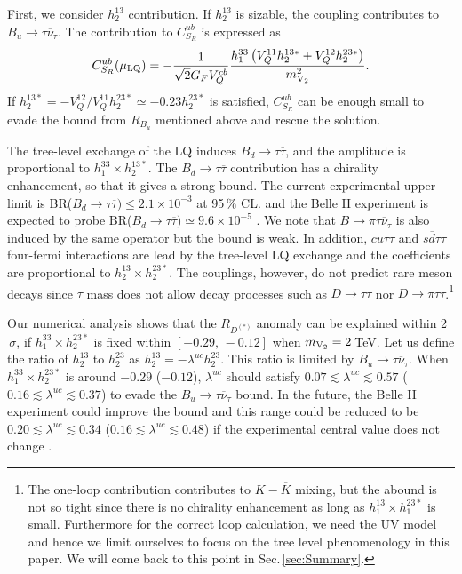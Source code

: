 \documentclass[12pt, a4paper]{article}
\numberwithin{equation}{section} %
\newcommand{\ov}{\overline}
\newcommand{\1}{\mbox{1}\hspace{-0.25em}\mbox{l}}
\begin{document}
First, we consider $h_2^{13}$ contribution. If $h_2^{13}$ is sizable, the coupling contributes to $B_u\to\tau\ov\nu_\tau$.  
The contribution to $C_{S_R}^{ub}$ is expressed as 
\begin{align}
C_{S_R}^{ub}(\mu_{\rm{LQ}})= -\frac{1}{\sqrt{2}G_F V_Q^{cb}}\frac{h_1^{33}\left(V_Q^{11}h_2^{13*}+V_Q^{12}h_2^{23*}\right)}{m_{\rm{V}_2}^2}.
\end{align}
If $h_2^{13*}=-V_Q^{12}/V_Q^{11}h_2^{23*}\simeq -0.23h_2^{23*}$ is satisfied, $C_{S_R}^{ub}$ can be enough small to evade the bound from $R_{B_u}$ mentioned above and rescue the solution.

The tree-level exchange of the LQ induces $B_d\to \tau \ov\tau$, and the amplitude is proportional to $h_1^{33} \times h_2^{13*}$.
The $B_d\to \tau\ov\tau$ contribution has a chirality enhancement, so that it gives a strong bound.
The current experimental upper limit is BR($B_d\to\tau\ov\tau)\le 2.1 \times 10^{-3}$ at 95\,$\%$ CL. \cite{PDG2022} and the Belle II experiment is expected to probe BR($B_d\to\tau\ov\tau)\simeq 9.6 \times 10^{-5}$ \cite{Kou:2018nap}.
We note that $B\to\pi\tau\ov\nu_\tau$ is also induced by the same operator but the bound is weak. 
In addition, $c\ov u\tau\ov \tau$ and $s\ov d\tau\ov\tau$ four-fermi interactions are lead by the tree-level LQ exchange 
and the coefficients are proportional to $h_2^{13} \times h_2^{23*}$.
The couplings, however, do not predict rare meson decays since $\tau$ mass does not allow decay processes such as $D\to\tau\ov\tau$ nor $D\to \pi \tau\ov\tau$.\footnote{The one-loop contribution contributes to $K-\ov{K}$ mixing, but the abound is not so tight since there is no chirality enhancement as long as $h_1^{13}\times h_1^{23*}$ is small.
Furthermore for the correct loop calculation, we need the UV model and hence we limit ourselves to focus on the tree level phenomenology in this paper. 
We will come back to this point in Sec.\,\ref{sec:Summary}.}


Our numerical analysis shows that the $R_{D^{(*)}}$ anomaly can be explained within 2$\,\sigma$, if $h_1^{33}\times h_2^{23*}$ is fixed within $[-0.29,\,-0.12]$ when $m_{\rm{V}_2}=2\,$TeV.
Let us define the ratio of $h_2^{13}$ to $h_2^{23}$ as $h_2^{13}=-\lambda^{uc} h_2^{23}$.
This ratio is limited by $B_u\to\tau\ov\nu_\tau$.
When $h_1^{33}\times h_2^{23*}$ is around $-0.29$ ($-0.12$),
$\lambda^{uc}$ should satisfy $0.07\lesssim\lambda^{uc}\lesssim 0.57$ ($0.16\lesssim\lambda^{uc}\lesssim 0.37$) to evade the $B_u\to\tau\ov\nu_\tau$ bound.
In the future, the Belle II experiment could improve the bound and this range could be reduced to be $0.20\lesssim\lambda^{uc}\lesssim 0.34$ ($0.16\lesssim\lambda^{uc}\lesssim 0.48$) if the experimental central value does not change \cite{Kou:2018nap}.
\end{document}

